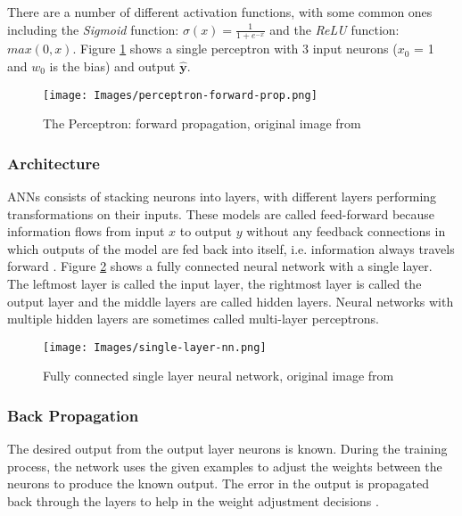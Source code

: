 There are a number of different activation functions, with some common ones including the \textit{Sigmoid} function: $ \sigma(x) = \frac{1}{1 + e^{-x}} $ and the \textit{ReLU} function: $ max(0, x) $. Figure \ref{fig:perceptron} shows a single perceptron with 3 input neurons ($x_0$ = 1 and $w_0$ is the bias) and output $\mathbf{\hat y}$.

\begin{figure}[H]
\begin{center}
    \texttt{[image: Images/perceptron-forward-prop.png]}
    \caption{The Perceptron: forward propagation, original image from \cite{methods-for-ds-slides}}
    \label{fig:perceptron}
\end{center}
\end{figure}

\subsubsection{Architecture}

ANNs consists of stacking neurons into layers, with different layers performing transformations on their inputs. These models are called feed-forward because information flows from input $x$ to output $y$ without any feedback connections in which outputs of the model are fed back into itself, i.e. information always travels forward \cite{deep-learning-book}. Figure \ref{fig:nn-architecture} shows a fully connected neural network with a single layer. The leftmost layer is called the input layer, the rightmost layer is called the output layer and the middle layers are called hidden layers. Neural networks with multiple hidden layers are sometimes called multi-layer perceptrons.

\begin{figure}[H]
\begin{center}
    \texttt{[image: Images/single-layer-nn.png]}
    \caption{Fully connected single layer neural network, original image from \cite{methods-for-ds-slides}}
    \label{fig:nn-architecture}
\end{center}
\end{figure}

\subsubsection{Back Propagation}

The desired output from the output layer neurons is known. During the training process, the network uses the given examples to adjust the weights between the neurons to produce the known output. The error in the output is propagated back through the layers to help in the weight adjustment decisions \cite{ann-prediction}.

